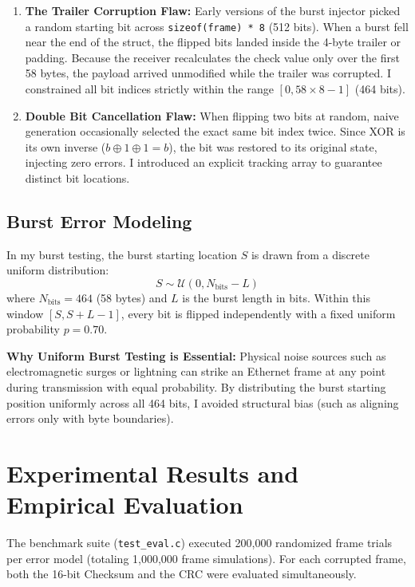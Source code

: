 \documentclass[12pt,a4paper]{article}
\begin{document}
\begin{enumerate}[leftmargin=*]
    \item \textbf{The Trailer Corruption Flaw:} Early versions of the burst injector picked a random starting bit across \texttt{sizeof(frame) * 8} (512 bits). When a burst fell near the end of the struct, the flipped bits landed inside the 4-byte trailer or padding. Because the receiver recalculates the check value only over the first 58 bytes, the payload arrived unmodified while the trailer was corrupted. I constrained all bit indices strictly within the range $[0, 58 \times 8 - 1]$ (464 bits).
    \item \textbf{Double Bit Cancellation Flaw:} When flipping two bits at random, naive generation occasionally selected the exact same bit index twice. Since XOR is its own inverse ($b \oplus 1 \oplus 1 = b$), the bit was restored to its original state, injecting zero errors. I introduced an explicit tracking array to guarantee distinct bit locations.
\end{enumerate}

\subsection{Burst Error Modeling}
In my burst testing, the burst starting location $S$ is drawn from a discrete uniform distribution:
\begin{equation}
    S \sim \mathcal{U}\left(0, N_{\text{bits}} - L\right)
\end{equation}
where $N_{\text{bits}} = 464$ (58 bytes) and $L$ is the burst length in bits. Within this window $[S, S + L - 1]$, every bit is flipped independently with a fixed uniform probability $p = 0.70$. 

\noindent\textbf{Why Uniform Burst Testing is Essential:}
Physical noise sources such as electromagnetic surges or lightning can strike an Ethernet frame at any point during transmission with equal probability. By distributing the burst starting position uniformly across all 464 bits, I avoided structural bias (such as aligning errors only with byte boundaries).

\section{Experimental Results and Empirical Evaluation}

The benchmark suite (\texttt{test\_eval.c}) executed 200,000 randomized frame trials per error model (totaling 1,000,000 frame simulations). For each corrupted frame, both the 16-bit Checksum and the CRC were evaluated simultaneously.
\end{document}
